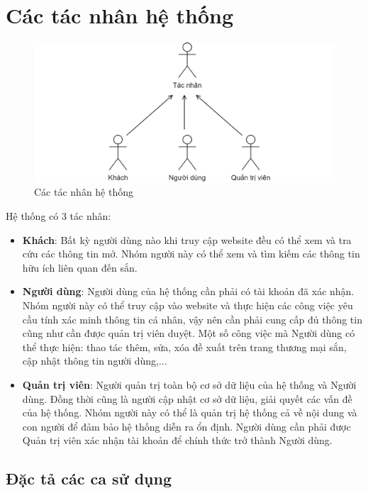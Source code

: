 \documentclass[./../main.tex]{subfiles}
\begin{document}
\section{Các tác nhân hệ thống}

\begin{figure}[H]
    \centering
    \includegraphics[width=\linewidth]{./img/actors.png}
    \caption{Các tác nhân hệ thống}
\end{figure}

Hệ thống có 3 tác nhân:
\begin{itemize}
    \item \textbf{Khách}: Bất kỳ người dùng nào khi truy cập website đều có thể xem và tra cứu các thông tin mở. Nhóm người này có thể xem và tìm kiếm các thông tin hữu ích liên quan đến sắn.
    \item \textbf{Người dùng}: Người dùng của hệ thống cần phải có tài khoản đã xác nhận. Nhóm người này có thể truy cập vào website và thực hiện các công việc yêu cầu tính xác minh thông tin cá nhân, vậy nên cần phải cung cấp đủ thông tin cũng như cần được quản trị viên duyệt. Một số công việc mà Người dùng có thể thực hiện: thao tác thêm, sửa, xóa đề xuất trên trang thương mại sắn, cập nhật thông tin người dùng,...\
    \item \textbf{Quản trị viên}: Người quản trị toàn bộ cơ sở dữ liệu của hệ thống và Người dùng. Đồng thời cũng là người cập nhật cơ sở dữ liệu, giải quyết các vấn đề của hệ thống. Nhóm người này có thể  là quản trị hệ thống cả về nội dung và con người để đảm bảo hệ thống diễn ra ổn định. Người dùng cần phải được Quản trị viên xác nhận tài khoản để chính thức trở thành Người dùng.
\end{itemize}


\subsection{Đặc tả các ca sử dụng}
\end{document}
